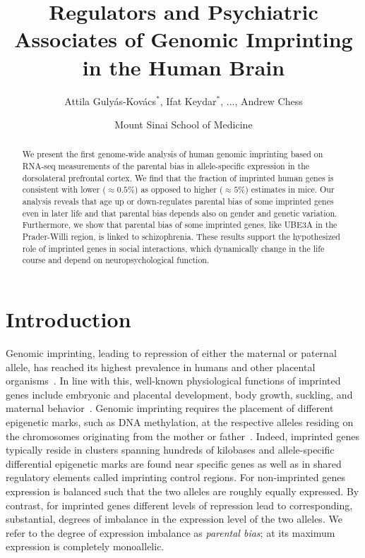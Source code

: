 \documentclass[letterpaper]{article}
\title{Regulators and Psychiatric Associates of Genomic Imprinting in the Human Brain}
\author{Attila Guly\'{a}s-Kov\'{a}cs\(^\ast\), Ifat Keydar\(^\ast\),
...,
Andrew Chess}
\date{Mount Sinai School of Medicine}
\begin{document}
\maketitle

\begin{abstract}
We present the first genome-wide analysis of human genomic imprinting based on
RNA-seq measurements of the parental bias in allele-specific expression in the
dorsolateral prefrontal cortex.  We find that the fraction of imprinted human
genes is consistent with lower (\(\approx 0.5\%\)) as opposed to higher
(\(\approx 5\%\)) estimates in mice.  Our analysis reveals that age up or
down-regulates parental bias of some imprinted genes even in later life and
that parental bias depends also on gender and genetic variation.  Furthermore,
we show that parental bias of some imprinted genes, like UBE3A in the
Prader-Willi region, is linked to schizophrenia.  These results support the
hypothesized role of imprinted genes in social interactions, which dynamically
change in the life course and depend on neuropsychological function.
\end{abstract}

\section{Introduction}

Genomic imprinting, leading to repression of either the maternal or paternal
allele, has reached its highest prevalence in humans and other placental
organisms~\cite{Renfree2012}.  In line with this, well-known physiological
functions of imprinted genes include embryonic and placental development, body
growth, suckling, and maternal behavior~\cite{Plasschaert2014,Peters2014}.
Genomic imprinting requires the placement of different epigenetic marks, such
as DNA methylation, at the respective alleles residing on the chromosomes
originating from the mother or father~\cite{Plasschaert2014}.  Indeed,
imprinted genes typically reside in clusters spanning hundreds of kilobases
and allele-specific differential epigenetic marks are found near specific
genes as well as in shared regulatory elements called imprinting control
regions. For non-imprinted genes expression is balanced such that the two
alleles are roughly equally expressed. By contrast, for imprinted genes
different levels of repression lead to corresponding, substantial, degrees of
imbalance in the expression level of the two alleles.  We refer to the degree
of expression imbalance as \emph{parental bias}; at its maximum expression is
completely monoallelic.
\end{document}
